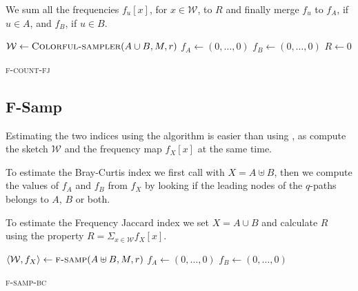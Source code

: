 We sum all the frequencies $f_u[x]$, for $x \in \mathcal{W}$, to $R$ and finally merge $f_{u}$ to $f_A$, if $u \in A$, and $f_B$, if $u \in B$.

\begin{algorithm}[h]
	\small
	\DontPrintSemicolon
	\BlankLine
	$\mathcal{W} \gets \textsc{Colorful-sampler}(A \cup B, M, r)$ \;
	$f_A \gets (0,\ldots,0)$\;
	$f_B \gets (0,\ldots,0)$\;
	$R \gets 0$\;
	\BlankLine
	\BlankLine
	\caption{\textsc{f-count-fj}}
	\label{alg:f-count-fj}
\end{algorithm}

\subsection*{F-Samp}

Estimating the two indices using the \fsamp algorithm is easier than using \fcount, as \fsamp compute the sketch $\mathcal{W}$ and the frequency map $f_X[x]$ at the same time.\medskip

To estimate the Bray-Curtis index we first call \fsamp with $X = A \uplus B$, then we compute the values of $f_A$ and $f_B$ from $f_X$ by looking if the leading nodes of the $q$-paths belongs to $A$, $B$ or both.

To estimate the Frequency Jaccard index we set $X = A \cup B$ and calculate $R$ using the property $R = \Sigma_{x \in \mathcal{W}}{f_X[x]}$.

\clearpage

\begin{algorithm}[h]
	\small
	\DontPrintSemicolon
	$\langle \mathcal{W}, f_X \rangle \gets \textsc{f-samp}(A \uplus B, M, r)$ \;
	$f_A \gets (0,\ldots,0)$\;
	$f_B \gets (0,\ldots,0)$\;
	\caption{\textsc{f-samp-bc}}
	\label{alg:f-samp-bc}
\end{algorithm}

